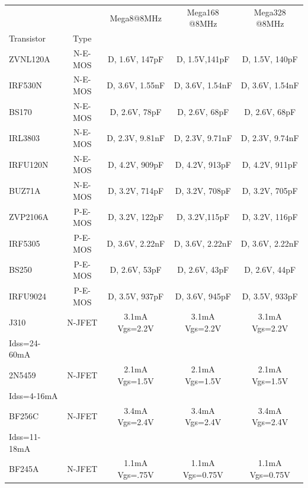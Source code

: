 \begin{table}[H]
  \begin{center}
    \begin{tabular}{| l | c | c | c | c |}
    \hline
             &         & Mega8@8MHz       & Mega168 @8MHz    & Mega328 @8MHz \\
 Transistor  & Type    &                  &                  &               \\
    \hline
    \hline
ZVNL120A     & N-E-MOS & D, 1.6V, 147pF   & D, 1.5V,141pF    & D, 1.5V, 140pF \\
    \hline
IRF530N      & N-E-MOS & D, 3.6V, 1.55nF  & D, 3.6V, 1.54nF  & D, 3.6V, 1.54nF \\
    \hline
BS170        & N-E-MOS & D, 2.6V, 78pF    & D, 2.6V, 68pF    & D, 2.6V, 68pF \\
    \hline
IRL3803      & N-E-MOS & D, 2.3V, 9.81nF  & D, 2.3V, 9.71nF  & D, 2.3V, 9.74nF \\
    \hline
IRFU120N     & N-E-MOS & D, 4.2V, 909pF   & D, 4.2V, 913pF   & D, 4.2V, 911pF \\
    \hline
BUZ71A       & N-E-MOS & D, 3.2V, 714pF   & D, 3.2V, 708pF   & D, 3.2V, 705pF \\
    \hline
ZVP2106A     & P-E-MOS & D, 3.2V, 122pF   & D, 3.2V,115pF    & D, 3.2V, 116pF \\
    \hline
IRF5305      & P-E-MOS & D, 3.6V, 2.22nF  & D, 3.6V, 2.22nF  & D, 3.6V, 2.22nF \\
    \hline
BS250        & P-E-MOS & D, 2.6V, 53pF    & D, 2.6V, 43pF    & D, 2.6V, 44pF \\
    \hline
IRFU9024     & P-E-MOS & D, 3.5V, 937pF   & D, 3.6V, 945pF   & D, 3.5V, 933pF \\
    \hline
J310         & N-JFET  & 3.1mA Vgs=2.2V   & 3.1mA Vgs=2.2V   & 3.1mA Vgs=2.2V \\
Idss=24-60mA &         &                  &                  &              \\
    \hline
2N5459       & N-JFET  & 2.1mA Vgs=1.5V   & 2.1mA Vgs=1.5V   & 2.1mA Vgs=1.5V \\
Idss=4-16mA &          &                  &                  &              \\
    \hline
BF256C       & N-JFET  & 3.4mA Vgs=2.4V   & 3.4mA Vgs=2.4V   & 3.4mA Vgs=2.4V \\
Idss=11-18mA &         &                  &                  &              \\
    \hline
BF245A       & N-JFET  & 1.1mA Vgs=.75V   & 1.1mA Vgs=0.75V  & 1.1mA Vgs=0.75V \\

\end{tabular}
\end{center}
\end{table}
